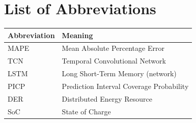 \chapter*{List of Abbreviations}
\begin{tabularx}{\linewidth}{@{}lX@{}}
\toprule
\textbf{Abbreviation} & \textbf{Meaning} \\
\midrule
MAPE & Mean Absolute Percentage Error \\
TCN & Temporal Convolutional Network \\
LSTM & Long Short-Term Memory (network) \\
PICP & Prediction Interval Coverage Probability \\
DER & Distributed Energy Resource \\
SoC & State of Charge \\
\bottomrule
\end{tabularx}

